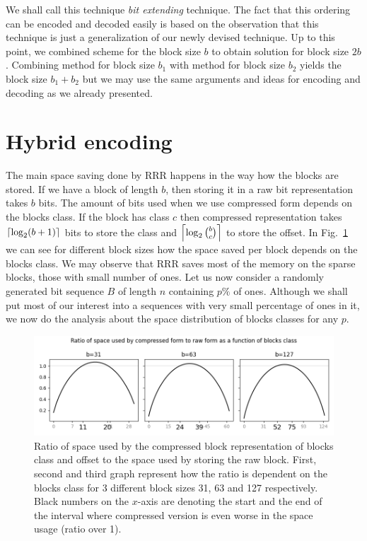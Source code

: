 We shall call this technique \textit{bit extending} technique. The fact that this
ordering can be encoded and decoded easily is based on the observation that this technique
is just a generalization of our newly devised technique. Up to this point, we combined
scheme for the block size $b$ to obtain solution for block size $2b$. Combining method
for block size $b_1$ with method for block size $b_2$ yields the block size $b_1+b_2$
but we may use the same arguments and ideas for encoding and decoding as we already presented. 

\section{Hybrid encoding}


The main space saving done by RRR happens in the way how the blocks are stored. If we have
a block of length $b$, then storing it in a raw bit representation takes $b$ bits.
The amount of bits used when we use compressed form depends on the blocks class. If the block
has class $c$ then compressed representation takes $\left\lceil \log_2 (b+1) \right\rceil$ bits to store the
class and $\left\lceil \log_2{b\choose c} \right\rceil$ to store the offset. In
Fig.~\ref{obr:rrrSpaceSavings} we can see for different block sizes how the space saved
per block depends on the blocks class. We may observe that RRR saves most of the memory on the
sparse blocks, those with small number of ones. Let us now consider a randomly
generated bit sequence $B$ of length $n$ containing $p\%$ of ones. Although we shall put most of
our interest into a sequences with very small percentage of ones in it, we now do the analysis
about the space distribution of blocks classes for any $p$.

\begin{figure}
	\centerline{
		\includegraphics[width=\textwidth]{images/rrr_space_savings}
	}
	\caption[TODO]{Ratio of space used by the compressed
    block representation of blocks class and offset to the space used by storing the raw
    block. First, second and third graph represent how the ratio is dependent on the blocks
    class for 3 different block sizes 31, 63 and 127 respectively. Black numbers on the $x$-axis
    are denoting the start and the end of the interval where compressed version is even worse
    in the space usage (ratio over 1).
	}
	\label{obr:rrrSpaceSavings}
\end{figure}

